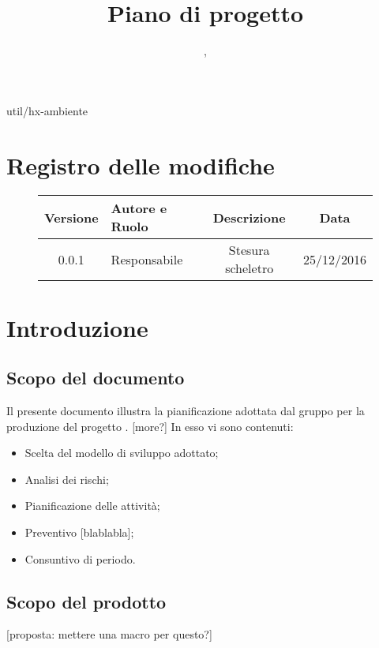 
 {util/hx-ambiente}
\author{\LB, \PB}
\supervisor{\GG, \MM}
\title{Piano di progetto}

\renewcommand{\arraystretch}{1.5}
\setcounter{tocdepth}{4}
\setcounter{secnumdepth}{4}


\maketitle
	\section*{Registro delle modifiche}
	\begin{figure}[htb]
	\centering
	\begin{tabular}{cp{3cm}cc}
	Versione & Autore e Ruolo          & Descrizione       & Data       \\ \hline
	0.0.1    & {\LB} Responsabile & Stesura scheletro & 25/12/2016 \\ \hline
	\end{tabular}
	\end{figure}
\tableofcontents

\section{Introduzione}
	\subsection{Scopo del documento}
	Il presente documento illustra la pianificazione adottata dal gruppo {\hx} per la produzione del progetto {\proj}. [more?] In esso vi sono contenuti:
\begin{itemize}
	\item Scelta del modello di sviluppo adottato;
	\item Analisi dei rischi;
	\item Pianificazione delle attività;
	\item Preventivo [blablabla];
    \item Consuntivo di periodo.
\end{itemize}

	\subsection{Scopo del prodotto}
	[proposta: mettere una macro per questo?]
